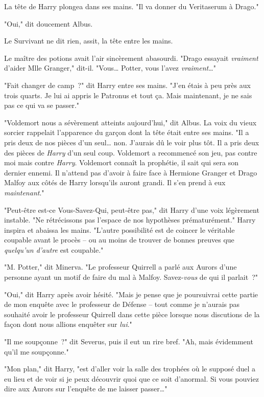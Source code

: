 La tête de Harry plongea dans ses mains. "Il va donner du Veritaserum à Drago."

"Oui," dit doucement Albus.

Le Survivant ne dit rien, assit, la tête entre les mains.

Le maître des potions avait l'air sincèrement abasourdi. "Drago essayait \emph{vraiment} d'aider Mlle Granger," dit-il. "Vous… Potter, vous l'avez \emph{vraiment}…"

"Fait changer de camp~?" dit Harry entre ses mains. "J'en étais à peu près aux trois quarts. Je lui ai appris le Patronus et tout ça. Mais maintenant, je ne sais pas ce qui va se passer."

"Voldemort nous a sévèrement atteints aujourd'hui," dit Albus. La voix du vieux sorcier rappelait l'apparence du garçon dont la tête était entre ses mains. "Il a pris deux de nos pièces d'un seul… non. J'aurais dû le voir plus tôt. Il a pris deux des pièces de \emph{Harry} d'un seul coup. Voldemort a recommencé son jeu, pas contre moi mais contre \emph{Harry}. Voldemort connaît la prophétie, il sait qui sera son dernier ennemi. Il n'attend pas d'avoir à faire face à Hermione Granger et Drago Malfoy aux côtés de Harry lorsqu'ils auront grandi. Il s'en prend à eux \emph{maintenant}."

"Peut-être est-ce Vous-Savez-Qui, peut-être pas," dit Harry d'une voix légèrement instable. "Ne rétrécissons pas l'espace de nos hypothèses prématurément." Harry inspira et abaissa les mains. "L'autre possibilité est de coincer le véritable coupable avant le procès -- ou au moins de trouver de bonnes preuves que \emph{quelqu'un d'autre} est coupable."

"M. Potter," dit Minerva. "Le professeur Quirrell a parlé aux Aurors d'une personne ayant un motif de faire du mal à Malfoy. Savez-\emph{vous} de qui il parlait~?"

"Oui," dit Harry après avoir hésité. "Mais je pense que je poursuivrai cette partie de mon enquête avec le professeur de Défense -- tout comme je n'aurais pas souhaité avoir le professeur Quirrell dans cette pièce lorsque nous discutions de la façon dont nous allions enquêter sur \emph{lui}."

"Il me soupçonne~?" dit Severus, puis il eut un rire bref. "Ah, mais évidemment qu'il me soupçonne."

"Mon plan," dit Harry, "est d'aller voir la salle des trophées où le supposé duel a eu lieu et de voir si je peux découvrir quoi que ce soit d'anormal. Si vous pouviez dire aux Aurors sur l'enquête de me laisser passer…"

